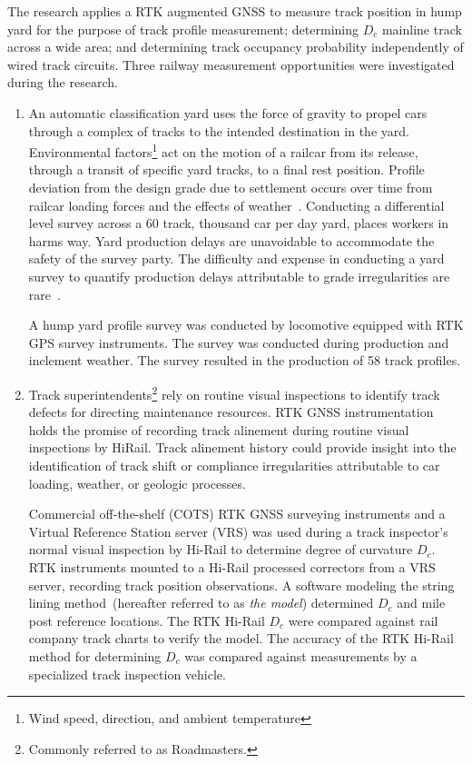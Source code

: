 The research applies a RTK augmented GNSS to measure track position in hump yard for the purpose of track profile measurement; determining $D_c$ mainline track across a wide area; and determining track occupancy probability independently of wired track circuits. Three railway measurement opportunities were investigated during the research.
\begin{enumerate}[1)]
\firmlist
	\item An automatic classification yard uses the force of gravity to propel cars through a complex of tracks to the intended destination in the yard. Environmental factors\footnote{Wind speed, direction, and ambient temperature} act on the motion of a railcar from its release, through a transit of specific yard tracks, to a final rest position. Profile deviation from the design grade due to settlement occurs over time from railcar loading forces and the effects of weather~\citep{2005szwilski_kerchof}. Conducting a differential level survey across a 60 track, thousand car per day yard, places workers in harms way. Yard production delays are unavoidable to accommodate the safety of the survey party. The difficulty and expense in conducting a yard survey to quantify production delays attributable to grade irregularities are rare~\citep{2007barnes}. 
	
	A hump yard profile survey was conducted by locomotive equipped with RTK GPS survey instruments. The survey was conducted during production and inclement weather. The survey resulted in the production of 58 track profiles.
	
	\item Track superintendents\footnote{Commonly referred to as Roadmasters.} rely on routine visual inspections to identify track defects for directing maintenance resources. RTK GNSS instrumentation holds the promise of recording track alinement during routine visual inspections by HiRail. Track alinement history could provide insight into the identification of track shift or compliance irregularities attributable to car loading, weather, or geologic processes.
	
	Commercial off-the-shelf (COTS) RTK GNSS surveying instruments and a Virtual Reference Station server (VRS) was used during a track inspector's normal visual inspection by Hi-Rail to determine degree of curvature ${D_c}$. RTK instruments mounted to a Hi-Rail processed correctors from a VRS server, recording track position observations. A software modeling the string lining method~\citep{49CFR213D,2007FRATrack,2009bright.rtrack}(hereafter referred to as \emph{the model}) determined ${D_c}$ and mile post reference locations. The RTK Hi-Rail $D_c$ were compared against rail company track charts to verify the model. The accuracy of the RTK Hi-Rail method for determining $D_c$ was compared against measurements by a specialized track inspection vehicle.
	

\end{enumerate}
